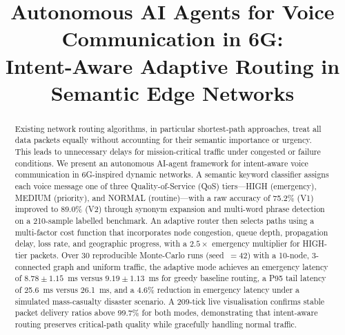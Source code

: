 \documentclass[conference]{IEEEtran}
\begin{document}
\title{Autonomous AI Agents for Voice Communication in 6G:\\
Intent-Aware Adaptive Routing in Semantic Edge Networks}

\author{
  \and
}

\maketitle

\begin{abstract}
Existing network routing algorithms, in particular shortest-path approaches,
treat all data packets equally without accounting for their semantic importance
or urgency.  This leads to unnecessary delays for mission-critical traffic
under congested or failure conditions.  We present an autonomous AI-agent
framework for intent-aware voice communication in 6G-inspired dynamic networks.
A semantic keyword classifier assigns each voice message one of three
Quality-of-Service (QoS) tiers—HIGH (emergency), MEDIUM (priority), and
NORMAL (routine)—with a raw accuracy of 75.2\% (V1) improved to 89.0\% (V2)
through synonym expansion and multi-word phrase detection on a 210-sample
labelled benchmark.  An adaptive router then selects paths using a multi-factor
cost function that incorporates node congestion, queue depth, propagation delay,
loss rate, and geographic progress, with a $2.5\times$ emergency multiplier for
HIGH-tier packets.  Over 30 reproducible Monte-Carlo runs (seed~$=42$) with a
10-node, 3-connected graph and uniform traffic, the adaptive mode achieves an
emergency latency of $8.78 \pm 1.15$~ms versus $9.19 \pm 1.13$~ms for greedy
baseline routing, a P95 tail latency of 25.6~ms versus 26.1~ms, and a 4.6\%
reduction in emergency latency under a simulated mass-casualty disaster
scenario.  A 209-tick live visualisation confirms stable packet delivery ratios
above 99.7\% for both modes, demonstrating that intent-aware routing preserves
critical-path quality while gracefully handling normal traffic.
\end{abstract}
\end{document}
